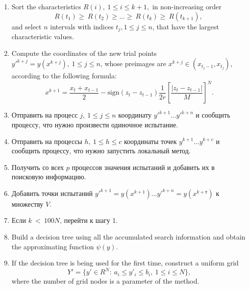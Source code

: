 \documentclass[runningheads]{llncs}
\begin{document}
\begin{enumerate}
	\item   Sort the characteristics  $R\left(i\right),\ 1\leq i \leq k+1,$  in non-increasing order
	\begin{equation} 
		\label{agp4_R_sort} 	R\left(t_1\right)\geq\ R\left(t_2\right)\geq...\geq\ R\left(t_k\right)\geq\ R(t_{k+1}),\  
	\end{equation} 
and select $n$ intervals with indices $t_j, 1 \le j \le n$, that have the largest characteristic values.	
	
	\item Compute the coordinates of the new trial points $y'^{k+j}=y\left(x^{k+j}\right), \ 1\leq j\leq n$, whose preimages are  $x^{k+j}\in\left(x_{t_j-1},x_{t_j}\right)$, according to the following formula:
	\begin{equation}
		\label{agp5_x1}
		x^{k+1}=\frac{x_t+x_{t-1}}{2}-\mathrm{sign}\left(z_t-z_{t-1}\right)\frac{1}{2r}\left[\frac{\left|z_t-z_{t-1}\right|}{M}\right]^N.
	\end{equation}	
	
	
	\item Отправить на процесс $j, \ 1\leq j\leq n$ координату $y'^{k+1} ... y'^{k+n}$  и сообщить процессу, что нужно произвести одиночное испытание.
	
	\item Отправить на процессы $h, \ 1\leq h\leq c$ координаты точек $y^{k+1} ... y^{k+c}$ и сообщить процессу, что нужно запустить локальный метод.
	
	\item Получить со всех $p$ процессов значения испытаний и добавить их в поисковую информацию.
	
	\item Добавить точки испытаний $y'^{k+1}=y\left(x^{k+1}\right) ... y'^{k+n}=y\left(x^{k+т}\right)$ к множеству $V$.
	
	\item Если $k\ <\ 100 N$, перейти к шагу 1.
	
	
	\item Build a decision tree using all the accumulated search information and obtain the approximating function $\psi(y)$.
	
	\item If the decision tree is being used for the first time, construct a uniform grid
	\begin{displaymath} 
		Y'=\{ y'\in R^N:\ a_i\le y'_i \le b_i,\ 1\le i\le N \},
	\end{displaymath} 
	where the number of grid nodes is a parameter of the method.
	

\end{enumerate}
\end{document}
